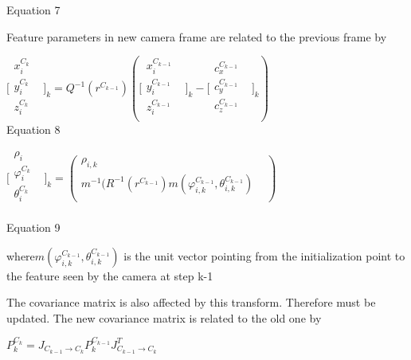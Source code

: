 Equation 7

Feature parameters in new camera frame are related to the previous frame 
by

$\lbrack \begin{matrix}
x_{i}^{C_{k}} & \\
y_{i}^{C_{k}} & \\
z_{i}^{C_{k}} & \\
\end{matrix}
\rbrack _{k}=Q^{-1}(r^{C_{k-1}})(\lbrack \begin{matrix}
x_{i}^{C_{k-1}} & \\
y_{i}^{C_{k-1}} & \\
z_{i}^{C_{k-1}} & \\
\end{matrix}
\rbrack _{k}- \lbrack \begin{matrix}
c_{x}^{C_{k-1}} & \\
c_{y}^{C_{k-1}} & \\
c_{z}^{C_{k-1}} & \\
\end{matrix}
\rbrack _{k})$\\


Equation 8

\begin{center}$\lbrack \begin{matrix}
\rho _{i} & \\
\varphi _{i}^{C_{k}} & \\
\theta _{i}^{C_{k}} & \\
\end{matrix}
\rbrack _{k}=(\begin{matrix}
\rho _{i, k} & \\
m^{-1}(R^{-1}(r^{C_{k-1}})m(\varphi _{i, k}^{C_{k-1}}, \theta _{i, 
k}^{C_{k-1}}) & \\
\end{matrix}
)$\\
\end{center}

Equation 9

where$m(\varphi _{i, k}^{C_{k-1}}, \theta _{i, k}^{C_{k-1}})$ is the 
unit vector pointing from the initialization point to the feature seen 
by the camera at step k-1

The covariance matrix is also affected by this transform. Therefore must 
be updated. The new covariance matrix is related to the old one by 

$P_{k}^{C_{k}}=J_{C_{k-1}\to C_{k}}P_{k}^{C_{k-1}}J_{C_{k-1}\to 
C_{k}}^{T}$\\


